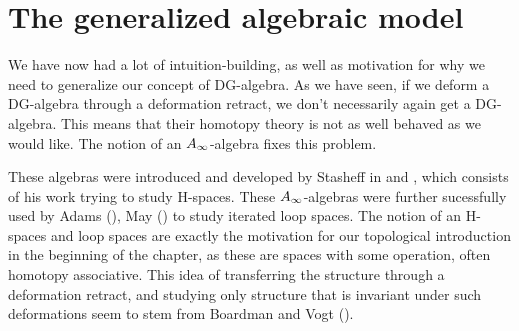 






\section{The generalized algebraic model}

We have now had a lot of intuition-building, as well as motivation for why we need to generalize our concept of DG-algebra. As we have seen, if we deform a DG-algebra through a deformation retract, we don't necessarily again get a DG-algebra. This means that their homotopy theory is not as well behaved as we would like. The notion of an $A_{\infty}$-algebra fixes this problem. 

These algebras were introduced and developed by Stasheff in \cite{h-spaces1} and \cite{h-spaces2}, which consists of his work trying to study H-spaces. These $A_{\infty}$-algebras were further sucessfully used by Adams (\cite{adams_loop}), May (\cite{may_loop}) to study iterated loop spaces. The notion of an H-spaces and loop spaces are exactly the motivation for our topological introduction in the beginning of the chapter, as these are spaces with some operation, often homotopy associative. This idea of transferring the structure through a deformation retract, and studying only structure that is invariant under such deformations seem to stem from Boardman and Vogt (\cite{boardman_vogt}). 

